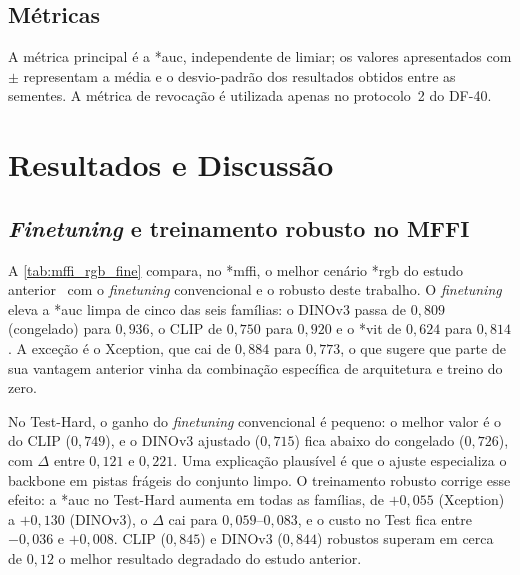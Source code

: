 \documentclass[10pt,conference]{IEEEtran}
\makeatletter
\newcommand{\acr@use}[2]{%
  \@ifundefined{acr@short@#1}{\textbf{??#1??}}{%
    \@ifundefined{acr@used@#1}{%
      \ifnum#2=0 \csname acr@long@#1\endcsname\else\csname acr@longpl@#1\endcsname\fi
      ~(\csname acr@short@#1\endcsname\ifnum#2=1 s\fi)%
      \expandafter\gdef\csname acr@used@#1\endcsname{}%
    }{%
      \csname acr@short@#1\endcsname\ifnum#2=1 s\fi
    }}%
}
\DeclareRobustCommand{\gls}{\@ifstar{\acr@use@s}{\acr@use@s}}
\newcommand{\acr@use@s}[1]{\acr@use{#1}{0}}
\makeatother
\begin{document}
\subsection{Métricas}

A métrica principal é a \gls*{auc}, independente de limiar; os valores apresentados com $\pm$ representam a média e o desvio-padrão dos resultados obtidos entre as sementes. A métrica de revocação é utilizada apenas no protocolo~2 do DF-40.

\section{Resultados e Discussão}
\label{sec:results}


\subsection{\textit{Finetuning} e treinamento robusto no MFFI}
\label{sec:mffi}

A \cref{tab:mffi_rgb_fine} compara, no \gls*{mffi}, o melhor cenário \gls*{rgb} do estudo anterior~\cite{cunha2026benchmarking} com o \textit{finetuning} convencional e o robusto deste trabalho.
O \textit{finetuning} eleva a \gls*{auc} limpa de cinco das seis famílias: o DINOv3 passa de $0{,}809$ (congelado) para $0{,}936$, o CLIP de $0{,}750$ para $0{,}920$ e o \gls*{vit} de $0{,}624$ para $0{,}814$.
A exceção é o Xception, que cai de $0{,}884$ para $0{,}773$, o que sugere que parte de sua vantagem anterior vinha da combinação específica de arquitetura e treino do zero.

No Test-Hard, o ganho do \textit{finetuning} convencional é pequeno: o melhor valor é o do CLIP ($0{,}749$), e o DINOv3 ajustado ($0{,}715$) fica abaixo do congelado ($0{,}726$), com $\Delta$ entre $0{,}121$ e $0{,}221$.
Uma explicação plausível é que o ajuste especializa o backbone em pistas frágeis do conjunto limpo.
O treinamento robusto corrige esse efeito: a \gls*{auc} no Test-Hard aumenta em todas as famílias, de $+0{,}055$ (Xception) a $+0{,}130$ (DINOv3), o $\Delta$ cai para $0{,}059$--$0{,}083$, e o custo no Test fica entre $-0{,}036$ e $+0{,}008$.
CLIP ($0{,}845$) e DINOv3 ($0{,}844$) robustos superam em cerca de $0{,}12$ o melhor resultado degradado do estudo anterior.
\end{document}
